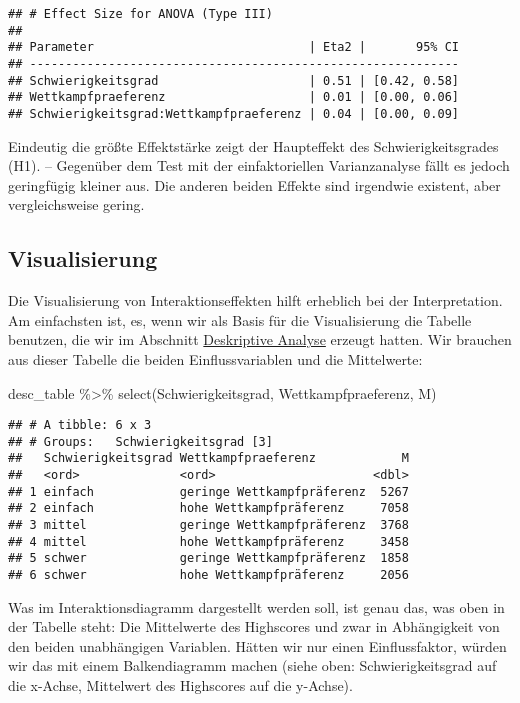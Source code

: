\documentclass[
]{book}
\newenvironment{Shaded}{\begin{snugshade}}{\end{snugshade}}
\newcommand{\FunctionTok}[1]{\textcolor[rgb]{0.00,0.00,0.00}{#1}}
\newcommand{\NormalTok}[1]{#1}
\newcommand{\SpecialCharTok}[1]{\textcolor[rgb]{0.00,0.00,0.00}{#1}}
\begin{document}
\begin{verbatim}
## # Effect Size for ANOVA (Type III)
## 
## Parameter                              | Eta2 |       95% CI
## ------------------------------------------------------------
## Schwierigkeitsgrad                     | 0.51 | [0.42, 0.58]
## Wettkampfpraeferenz                    | 0.01 | [0.00, 0.06]
## Schwierigkeitsgrad:Wettkampfpraeferenz | 0.04 | [0.00, 0.09]
\end{verbatim}

Eindeutig die größte Effektstärke zeigt der Haupteffekt des Schwierigkeitsgrades (H1). -- Gegenüber dem Test mit der einfaktoriellen Varianzanalyse fällt es jedoch geringfügig kleiner aus. Die anderen beiden Effekte sind irgendwie existent, aber vergleichsweise gering.

\hypertarget{visualisierung}{%
\subsection{Visualisierung}\label{visualisierung}}

Die Visualisierung von Interaktionseffekten hilft erheblich bei der Interpretation. Am einfachsten ist, es, wenn wir als Basis für die Visualisierung die Tabelle benutzen, die wir im Abschnitt \protect\hyperlink{deskriptive-analyse-1}{Deskriptive Analyse} erzeugt hatten. Wir brauchen aus dieser Tabelle die beiden Einflussvariablen und die Mittelwerte:

\begin{Shaded}
\begin{Highlighting}[]
\NormalTok{desc\_table }\SpecialCharTok{\%\textgreater{}\%} 
  \FunctionTok{select}\NormalTok{(Schwierigkeitsgrad, Wettkampfpraeferenz, M)}
\end{Highlighting}
\end{Shaded}

\begin{verbatim}
## # A tibble: 6 x 3
## # Groups:   Schwierigkeitsgrad [3]
##   Schwierigkeitsgrad Wettkampfpraeferenz            M
##   <ord>              <ord>                      <dbl>
## 1 einfach            geringe Wettkampfpräferenz  5267
## 2 einfach            hohe Wettkampfpräferenz     7058
## 3 mittel             geringe Wettkampfpräferenz  3768
## 4 mittel             hohe Wettkampfpräferenz     3458
## 5 schwer             geringe Wettkampfpräferenz  1858
## 6 schwer             hohe Wettkampfpräferenz     2056
\end{verbatim}

Was im Interaktionsdiagramm dargestellt werden soll, ist genau das, was oben in der Tabelle steht: Die Mittelwerte des Highscores und zwar in Abhängigkeit von den beiden unabhängigen Variablen. Hätten wir nur einen Einflussfaktor, würden wir das mit einem Balkendiagramm machen (siehe oben: Schwierigkeitsgrad auf die x-Achse, Mittelwert des Highscores auf die y-Achse).
\end{document}
